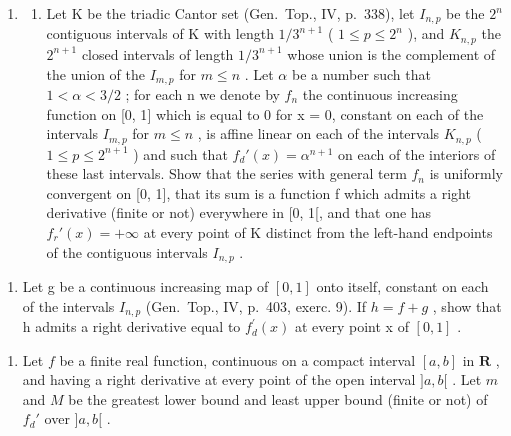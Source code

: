 \begin{enumerate}
\def\labelenumi{\arabic{enumi})}
\setcounter{enumi}{2}
\tightlist
\item
  \begin{enumerate}
  \def\labelenumii{\alph{enumii})}
  \tightlist
  \item
    Let K be the triadic Cantor set (Gen.~Top., IV, p.~338), let \(I_{n,p}\) be the \(2^{n}\) contiguous intervals of K with length \(1/3^{n+1}\) ( \(1 \leqslant p \leqslant 2^{n}\) ), and \(K_{n,p}\) the \(2^{n+1}\) closed intervals of length \(1/3^{n+1}\) whose union is the complement of the union of the \(I_{m,p}\) for \(m \leqslant n\) . Let \(\alpha\) be a number such that \(1 < \alpha < 3/2\) ; for each n we denote by \(f_{n}\) the continuous increasing function on {[}0, 1{]} which is equal to 0 for x = 0, constant on each of the intervals \(I_{m,p}\) for \(m \leqslant n\) , is affine linear on each of the intervals \(K_{n,p}\) ( \(1 \leqslant p \leqslant 2^{n+1}\) ) and such that \(f_{d}'(x) = \alpha^{n+1}\) on each of the interiors of these last intervals. Show that the series with general term \(f_{n}\) is uniformly convergent on {[}0, 1{]}, that its sum is a function f which admits a right derivative (finite or not) everywhere in {[}0, 1{[}, and that one has \(f_{r}'(x) = +\infty\) at every point of K distinct from the left-hand endpoints of the contiguous intervals \(I_{n,p}\) .
  \end{enumerate}
\end{enumerate}

\begin{enumerate}
\def\labelenumi{\alph{enumi})}
\setcounter{enumi}{1}
\tightlist
\item
  Let g be a continuous increasing map of \([0, 1]\) onto itself, constant on each of the intervals \(I_{n,p}\) (Gen.~Top., IV, p.~403, exerc. 9). If \(h = f + g\) , show that h admits a right derivative equal to \(f_{d}^{\prime}(x)\) at every point x of \([0, 1]\) .
\end{enumerate}

\begin{enumerate}
\def\labelenumi{\arabic{enumi})}
\setcounter{enumi}{3}
\tightlist
\item
  Let \(f\) be a finite real function, continuous on a compact interval \([a, b]\) in \(\mathbf{R}\) , and having a right derivative at every point of the open interval \(]a, b[\) . Let \(m\) and \(M\) be the greatest lower bound and least upper bound (finite or not) of \(f_d'\) over \(]a, b[\) .
\end{enumerate}


